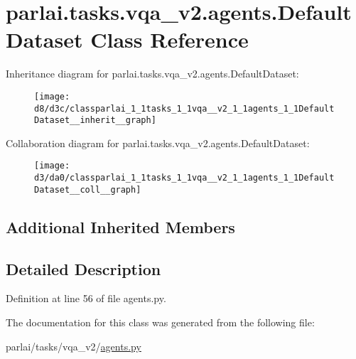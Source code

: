 \hypertarget{classparlai_1_1tasks_1_1vqa__v2_1_1agents_1_1DefaultDataset}{}\section{parlai.\+tasks.\+vqa\+\_\+v2.\+agents.\+Default\+Dataset Class Reference}
\label{classparlai_1_1tasks_1_1vqa__v2_1_1agents_1_1DefaultDataset}


Inheritance diagram for parlai.\+tasks.\+vqa\+\_\+v2.\+agents.\+Default\+Dataset\+:\nopagebreak
\begin{figure}[H]
\begin{center}
\leavevmode
\texttt{[image: d8/d3c/classparlai\_1\_1tasks\_1\_1vqa\_\_v2\_1\_1agents\_1\_1DefaultDataset\_\_inherit\_\_graph]}
\end{center}
\end{figure}


Collaboration diagram for parlai.\+tasks.\+vqa\+\_\+v2.\+agents.\+Default\+Dataset\+:\nopagebreak
\begin{figure}[H]
\begin{center}
\leavevmode
\texttt{[image: d3/da0/classparlai\_1\_1tasks\_1\_1vqa\_\_v2\_1\_1agents\_1\_1DefaultDataset\_\_coll\_\_graph]}
\end{center}
\end{figure}
\subsection*{Additional Inherited Members}


\subsection{Detailed Description}


Definition at line 56 of file agents.\+py.



The documentation for this class was generated from the following file\+:\begin{DoxyCompactItemize}
\item 
parlai/tasks/vqa\+\_\+v2/\hyperlink{parlai_2tasks_2vqa__v2_2agents_8py}{agents.\+py}\end{DoxyCompactItemize}
